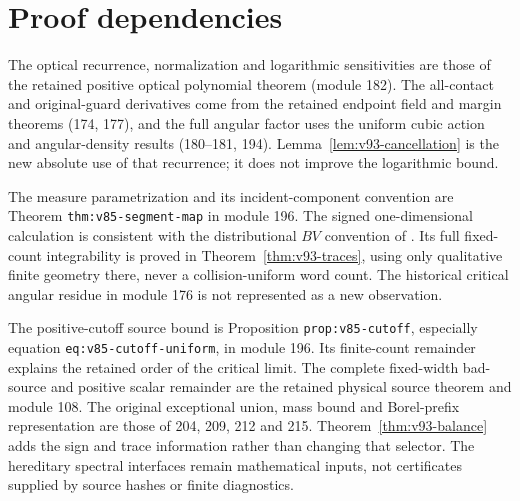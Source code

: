 \section{Proof dependencies}
The optical recurrence, normalization and logarithmic sensitivities are
those of the retained positive optical polynomial theorem (module 182).
The all-contact and original-guard derivatives come from the retained
endpoint field and margin theorems (174, 177), and the full angular
factor uses the uniform cubic action and angular-density results
(180--181, 194). Lemma~\ref{lem:v93-cancellation} is the new absolute
use of that recurrence; it does not improve the logarithmic bound.

The measure parametrization and its incident-component convention are
Theorem \texttt{thm:v85-segment-map} in module 196. The signed
one-dimensional calculation is consistent with the distributional
$BV$ convention of \cite{AFP}. Its full fixed-count integrability is
proved in Theorem~\ref{thm:v93-traces}, using only qualitative finite
geometry there, never a collision-uniform word count. The historical
critical angular residue in module 176 is not represented as a new
observation.

The positive-cutoff source bound is Proposition
\texttt{prop:v85-cutoff}, especially equation
\texttt{eq:v85-cutoff-uniform}, in module 196. Its finite-count
remainder explains the retained order of the critical limit. The
complete fixed-width bad-source and positive scalar remainder are
the retained physical source theorem and module 108. The original
exceptional union, mass bound and Borel-prefix representation are
those of 204, 209, 212 and 215. Theorem~\ref{thm:v93-balance} adds
the sign and trace information rather than changing that selector.
The hereditary spectral interfaces remain mathematical inputs, not
certificates supplied by source hashes or finite diagnostics.
